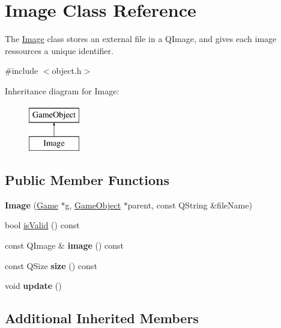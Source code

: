 \hypertarget{class_image}{}\section{Image Class Reference}
\label{class_image}


The \hyperlink{class_image}{Image} class stores an external file in a Q\+Image, and gives each image ressources a unique identifier.  




{\ttfamily \#include $<$object.\+h$>$}

Inheritance diagram for Image\+:\begin{figure}[H]
\begin{center}
\leavevmode
\includegraphics[height=2.000000cm]{class_image}
\end{center}
\end{figure}
\subsection*{Public Member Functions}
\begin{DoxyCompactItemize}
\item 
\hypertarget{class_image_a72923e3d24b0bbf9ff836878ea37091e}{}\label{class_image_a72923e3d24b0bbf9ff836878ea37091e} 
{\bfseries Image} (\hyperlink{class_game}{Game} $\ast$g, \hyperlink{class_game_object}{Game\+Object} $\ast$parent, const Q\+String \&file\+Name)
\item 
bool \hyperlink{class_image_ac78aa7b47e7a8b279d2e95ac309ab375}{is\+Valid} () const
\item 
\hypertarget{class_image_a3260e03530191f0dbf5f36d3dfcb7fcd}{}\label{class_image_a3260e03530191f0dbf5f36d3dfcb7fcd} 
const Q\+Image \& {\bfseries image} () const
\item 
\hypertarget{class_image_aba7c6caf7c7d8dc8238aa246a7149ec2}{}\label{class_image_aba7c6caf7c7d8dc8238aa246a7149ec2} 
const Q\+Size {\bfseries size} () const
\item 
\hypertarget{class_image_aa4f881e18d7b454ca185c05ec8e70b6d}{}\label{class_image_aa4f881e18d7b454ca185c05ec8e70b6d} 
void {\bfseries update} ()
\end{DoxyCompactItemize}
\subsection*{Additional Inherited Members}


